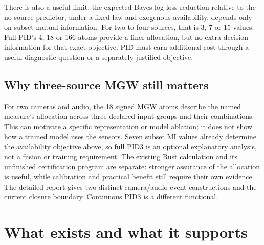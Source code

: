 \documentclass[11pt,a4paper]{article}
\begin{document}
There is also a useful limit: the expected Bayes log-loss reduction relative to the no-source predictor, under a fixed law and exogenous availability, depends only on subset mutual information. For two to four sources, that is 3, 7 or 15 values. Full PID's 4, 18 or 166 atoms provide a finer allocation, but no extra decision information for that exact objective. PID must earn additional cost through a useful diagnostic question or a separately justified objective.

\par{}

\subsection{Why three-source MGW still matters}\label{why-three-source-mgw-still-matters}

For two cameras and audio, the 18 signed MGW atoms describe the named measure's allocation across three declared input groups and their combinations. This can motivate a specific representation or model ablation; it does not show how a trained model uses the sensors. Seven subset MI values already determine the availability objective above, so full PID3 is an optional explanatory analysis, not a fusion or training requirement. The existing Rust calculation and its unfinished certification program are separate: stronger assurance of the allocation is useful, while calibration and practical benefit still require their own evidence. The detailed report gives two distinct camera/audio event constructions and the current closure boundary. Continuous PID3 is a different functional.

\par{}

\section{What exists and what it supports}\label{what-exists-and-what-it-supports}
\end{document}
